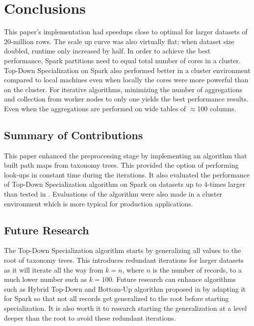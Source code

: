 \documentclass[11pt]{article}       %
\begin{document}
\section{Conclusions} \label{conclusion}

This paper's implementation had speedups close to optimal for larger datasets of 20-million rows. The scale up curve was also virtually flat; when dataset size doubled, runtime only increased by half. In order to achieve the best performance, Spark partitions need to equal total number of cores in a cluster. Top-Down Specialization on Spark also performed better in a cluster environment compared to local machines even when locally the cores were more powerful than on the cluster. For iterative algorithms, minimizing the number of aggregations and collection from worker nodes to only one yields the best performance results. Even when the aggregations are performed on wide tables of $\approx$100 columns.

\subsection{Summary of Contributions}

This paper enhanced the preprocessing stage by implementing an algorithm that built path maps from taxonomy trees. This provided the option of performing look-ups in constant time during the iterations. It also evaluated the performance of Top-Down Specialization algorithm on Spark on datasets up to 4-times larger than tested in \cite{Sopaoglu:2017}. Evaluations of the algorithm were also made in a cluster environment which is more typical for production applications.

\subsection{Future Research}

The Top-Down Specialization algorithm starts by generalizing all values to the root of taxonomy trees. This introduces redundant iterations for larger datasets as it will iterate all the way from \(k=n\), where $n$ is the number of records, to a much lower number such as \(k=100\). Future research can enhance algorithms such as Hybrid Top-Down and Bottom-Up algorithm proposed in \cite{Zhang:2013} by adapting it for Spark so that not all records get generalized to the root before starting specialization. It is also worth it to research starting the generalization at a level deeper than the root to avoid these redundant iterations.



\end{document}

